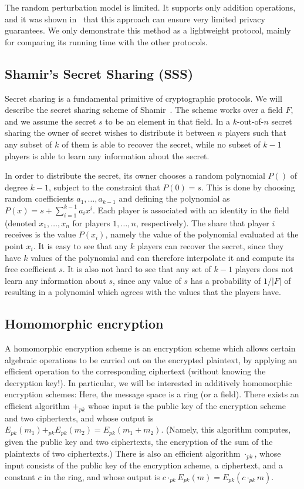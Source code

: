 \documentclass[times, 10pt,twocolumn]{article}
\begin{document}
The random perturbation model is limited. It supports only
addition operations, and it was shown in~\cite{DiNi} that this
approach can ensure very limited privacy guarantees. We only
demonstrate this method as a lightweight protocol, mainly for
comparing its running time with the other protocols.

\subsection{Shamir's Secret Sharing (SSS)}
Secret sharing is a fundamental primitive of cryptographic
protocols. We will describe the  secret sharing scheme of
Shamir~\cite{SSS}. The scheme works over a field $F$, and we
assume the secret $s$ to be an element in that field. In a
$k$-out-of-$n$ secret sharing the owner of secret wishes to
distribute it between $n$ players such that any subset of $k$ of
them is able to recover the secret, while no subset of $k-1$
players is able to learn any information about the secret.

In order to distribute the secret, its owner chooses a random
polynomial $P()$ of degree $k-1$, subject to the constraint that
$P(0)=s$. This is done by choosing random coefficients
$a_1,\ldots,a_{k-1}$ and defining the polynomial as
$P(x)=s+\sum_{i=1}^{k-1}a_ix^i$. Each player is associated with an
identity in the field (denoted $x_1,\ldots,x_n$\/ for players
$1,\ldots,n$, respectively). The share that player $i$ receives is the
value $P(x_i)$, namely the value of the polynomial evaluated at the
point $x_i$.  It is easy to see that any $k$ players can recover the
secret, since they have $k$ values of the polynomial and can therefore
interpolate it and compute its free coefficient $s$. It is also not
hard to see that any set of $k-1$ players does not learn any
information about $s$, since any value of $s$ has a probability of
$1/|F|$ of resulting in a polynomial which agrees with the values that
the players have.
\subsection{Homomorphic encryption}
A homomorphic encryption scheme is an encryption scheme which
allows certain algebraic operations to be carried out on the
encrypted plaintext, by applying an efficient operation to the
corresponding ciphertext (without knowing the decryption key!).
In particular, we will be interested in additively homomorphic
encryption schemes: Here, the message space is a ring (or
a field). There exists an efficient algorithm $+_{pk}$
whose input is the public key of the encryption scheme and two
ciphertexts, and whose output is $E_{pk}(m_1) +_{pk} E_{pk}(m_2) =
E_{pk}(m_1 + m_2)$. (Namely, this algorithm computes, given the
public key and two ciphertexts, the encryption of the sum of the
plaintexts of two ciphertexts.) There is also an efficient
algorithm $\cdot_{pk}$, whose input consists of the public key of
the encryption scheme, a ciphertext, and a constant $c$ in the
ring, and whose output is  $c\cdot_{pk} E_{pk}(m) = E_{pk}(c
\cdot_{pk} m)$.
\end{document}
